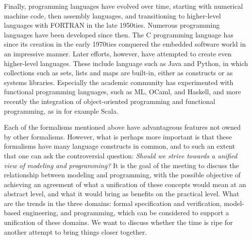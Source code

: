 Finally, programming languages have evolved over time, starting 
with numerical machine code, then assembly languages, and 
transitioning to higher-level languages with FORTRAN in the late 
1950ties. Numerous programming languages have been developed since 
then. The C programming language has  since its creation in the 
early 1970ties conquered the embedded software world in an 
impressive manner. Later efforts, however, have attempted to
create even higher-level languages. These include language such as
Java and Python, in which collections such as sets, lists and maps 
are built-in, either as constructs or as systems libraries. 
Especially the academic community has experimented with functional 
programming languages, such as ML, OCaml, and Haskell, and more 
recently the integration of object-oriented programming and 
functional programming, as in for example Scala.

Each of the formalisms mentioned above have advantageous features not owned by other formalisms. However, what is perhaps more important is that these formalisms have many language constructs in common, and to  such an extent that one can ask the controversial question: 
{\em Should we strive towards a unified view of modeling and 
programming?} 
It is the goal of the meeting to discuss the 
relationship between modeling and programming, with the possible 
objective of achieving an agreement of what a unification of these 
concepts would mean at an abstract level, and what it would bring 
as benefits on the practical level. What are the trends in the 
three domains: formal specification and verification,
model-based engineering, and
programming, which can be considered 
to support a unification of these domains. We want to discuss whether the time 
is ripe for another attempt to bring things closer together. 

